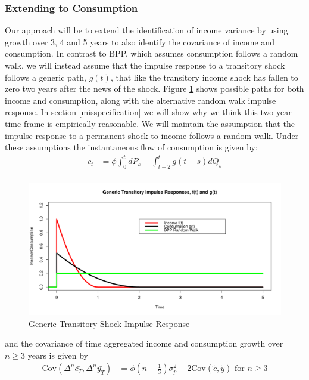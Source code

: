 \documentclass[titlepage]{\econtex}\newcommand{\texname}{IncomeUncertainty}
\begin{document}
\subsubsection{Extending \cite{carroll_nature_1997} to Consumption}
Our approach will be to extend the identification of income variance by using growth over 3, 4 and 5 years to also identify the covariance of income and consumption. In contrast to BPP, which assumes consumption follows a random walk, we will instead assume that the impulse response to a transitory shock follows a generic path, $g(t)$, that like the transitory income shock has fallen to zero two years after the news of the shock. Figure \ref{fig:GenericTransitoryBPP} shows possible paths for both income and consumption, along with the alternative random walk impulse response. In section \ref{misspecification} we will show why we think this two year time frame is empirically reasonable. We will maintain the assumption that the impulse response to a permanent shock to income follows a random walk. Under these assumptions the instantaneous flow of consumption is given by:
	\begin{align*}
c_t  &= \phi \int_{0}^{t}dP_s  + \int_{t-2}^{t} g(t-s)dQ_s  \\
\end{align*}
	\begin{figure} 
	\begin{centering}
		\includegraphics[scale=0.6]{Figures/GenericTransitoryConsumptionWithBPP.png} 
		\caption{Generic Transitory Shock Impulse Response}
		\label{fig:GenericTransitoryBPP}
	\end{centering}
\end{figure}
and the covariance of time aggregated income and consumption growth over $n \geq 3$ years is given by
	\begin{align}
\mathrm{Cov}(\Delta^n \bar{c_T},\Delta^n \bar{y_T} ) &= \phi (n-\frac{1}{3}) \sigma^2_p + 2 \mathrm{Cov}(\tilde{c},\tilde{y}) \text{  for  } n\geq 3 \label{covariance}
\end{align}
\end{document}
